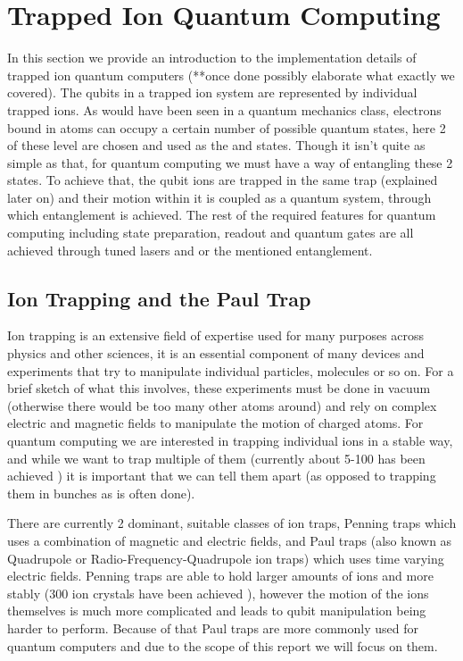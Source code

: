 
\section{Trapped Ion Quantum Computing \cite{bruzewiczTrappedionQuantumComputing2019}} \label{sec:Trapped}
In this section we provide an introduction to the implementation details of trapped ion quantum computers (**once done possibly elaborate what exactly we covered).
The qubits in a trapped ion system are represented by individual trapped ions.
As would have been seen in a quantum mechanics class, electrons bound in atoms can occupy a certain number of possible quantum states, here 2 of these level are chosen and used as the \kz and \ko states.
Though it isn't quite as simple as that, for quantum computing we must have a way of entangling these 2 states.
To achieve that, the qubit ions are trapped in the same trap (explained later on) and their motion within it is coupled as a quantum system, through which entanglement is achieved.
The rest of the required features for quantum computing including state preparation, readout and quantum gates are all achieved through tuned lasers and or the mentioned entanglement.

\subsection{Ion Trapping and the Paul Trap}
Ion trapping is an extensive field of expertise used for many purposes across physics and other sciences, it is an essential component of many devices and experiments that try to manipulate individual particles, molecules or so on.
For a brief sketch of what this involves, these experiments must be done in vacuum (otherwise there would be too many other atoms around) and rely on complex electric and magnetic fields to manipulate the motion of charged atoms.
For quantum computing we are interested in trapping individual ions in a stable way, and while we want to trap multiple of them (currently about 5-100 has been achieved \cite{paganoCryogenicTrappedionSystem2018}) it is important that we can tell them apart (as opposed to trapping them in bunches as is often done).

There are currently 2 dominant, suitable classes of ion traps, Penning traps which uses a combination of magnetic and electric fields, and Paul traps (also known as Quadrupole or Radio-Frequency-Quadrupole ion traps) which uses time varying electric fields.
Penning traps are able to hold larger amounts of ions and more stably (300 ion crystals have been achieved \cite{bohnetQuantumSpinDynamics2016}), however the motion of the ions themselves is much more complicated and leads to qubit manipulation being harder to perform.
Because of that Paul traps are more commonly used for quantum computers and due to the scope of this report we will focus on them.

